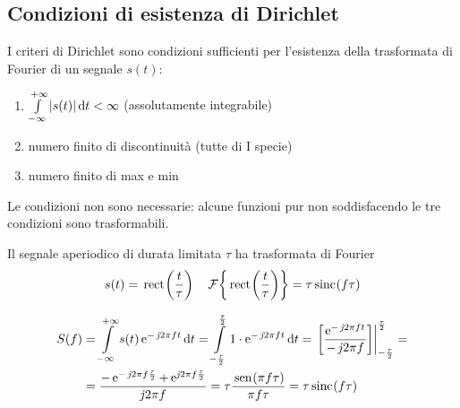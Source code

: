 \subsection{Condizioni di esistenza di Dirichlet}
I criteri di Dirichlet sono condizioni sufficienti per l'esistenza della trasformata di Fourier di un segnale $s(t)$:
\begin{enumerate}
\item $\int\limits_{-\infty}^{+\infty}{\left|{s(t)}\right|}{\,\mathop{}\!\mathrm{d}{t}}<\infty$ (assolutamente integrabile)
\item numero finito di discontinuità (tutte di I specie)
\item numero finito di max e min
\end{enumerate}
\begin{nota}Le condizioni non sono necessarie: alcune funzioni pur non soddisfacendo le tre condizioni sono trasformabili.\end{nota}
\begin{esempio}
Il segnale aperiodico di durata limitata $\tau$ ha trasformata di Fourier
\[s(t)=\,{\operatorname{rect}}^{}\!\left({\frac{t}{\tau}}\right)\quad\operatorname{\mathcal{F}}\!\left\lbrace{\,{\operatorname{rect}}^{}\!\left({\frac{t}{\tau}}\right)}\right\rbrace=\tau\,{\operatorname{sinc}}^{}\!\left({f\tau}\right) \]

\begin{figure}[ht]
\centering
{}\qquad
{}
\end{figure}

\begin{align*}
S(f)&=\intinf{s(t)\e{-\imath 2\pi f t}}{t}
	 =\intd{-\frac{\tau}{2}}{\frac{\tau}{2}}{1\cdot\e{-\imath 2\pi f t}}{t}
	 =\bound{-\frac{\tau}{2}}{\frac{\tau}{2}}{\frac{\e{-\imath 2\pi f t}}{-\imath 2\pi f}}=\\
	&=\frac{-\e{-\imath 2\pi f\frac{\tau}{2}}+\e{\imath 2\pi f\frac{\tau}{2}}}{\imath 2\pi f}
	 =\tau\frac{\sen{\pi f\tau}}{\pi f\tau}
	 =\tau\sinc{f\tau}
\end{align*}
\end{esempio}

